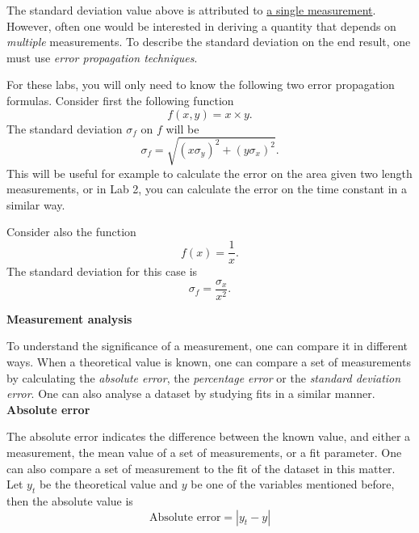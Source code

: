 \documentclass[12pt]{report}
\begin{document}
The standard deviation value above is attributed to \underline{a single measurement}. However, often one would be interested in deriving a quantity that depends on \textit{multiple} measurements. To describe the standard deviation on the end result, one must use \textit{error propagation techniques}.

For these labs, you will only need to know the following two error propagation formulas. Consider first the following function
\begin{equation}
f(x,y) = x \times y.
\label{Eq:f=xy}
\end{equation}
The standard deviation $\sigma_f$ on $f$ will be
\begin{equation}
\sigma_f = \sqrt{ (x \sigma_y)^2 + (y \sigma_x)^2}.
\label{Eq:product error}
\end{equation}
This will be useful for example to calculate the error on the area given two length measurements, or in Lab 2, you can calculate the error on the time constant in a similar way.

Consider also the function
\begin{equation}
f(x) = \frac{1}{x}.
\label{Eq:f=1/x}
\end{equation}
The standard deviation for this case is
\begin{equation}
\sigma_f = \frac{\sigma_x}{x^2}.
\label{Eq:1/x error}
\end{equation}


\noindent \large \textbf{Measurement analysis} \normalsize

To understand the significance of a measurement, one can compare it in different ways. When a theoretical value is known, one can compare a set of measurements by calculating the \textit{absolute error}, the \textit{percentage error} or the \textit{standard deviation error}. One can also analyse a dataset by studying fits in a similar manner. \\

\noindent \textbf{Absolute error}

The absolute error indicates the difference between the known value, and either a measurement, the mean value of a set of measurements, or a fit parameter. One can also compare a set of measurement to the fit of the dataset in this matter. Let $y_t$ be the theoretical value and $y$ be one of the variables mentioned before, then the absolute value is
\begin{equation}
\text{Absolute error} = \left\rvert y_t - y \right\rvert
\end{equation}
\end{document}
